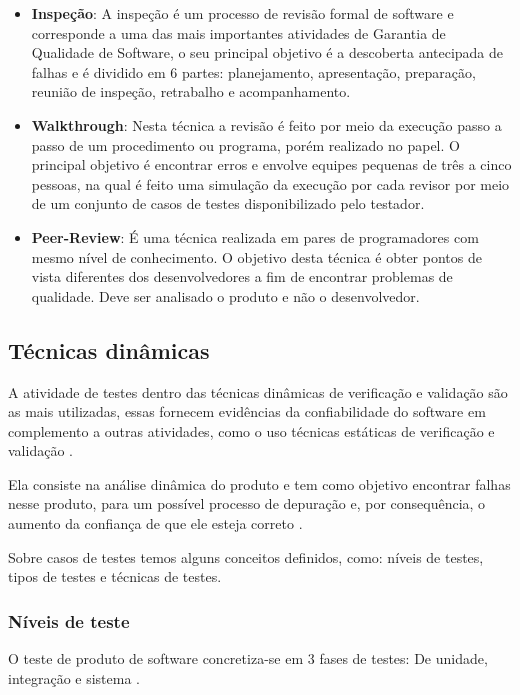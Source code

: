 \begin{itemize}
  \item \textbf{Inspeção}: A inspeção é um processo de revisão formal de software e corresponde a uma das mais importantes atividades de Garantia de Qualidade de Software, o seu principal objetivo é a descoberta antecipada de falhas e é dividido em 6 partes: planejamento, apresentação, preparação, reunião de inspeção, retrabalho e acompanhamento.
  \item \textbf{Walkthrough}: Nesta técnica a revisão é feito por meio da execução passo a passo de um procedimento ou programa, porém realizado no papel. O principal objetivo é encontrar erros e envolve equipes pequenas de três a cinco pessoas, na qual é feito uma simulação da execução por cada revisor por meio de um conjunto de casos de testes disponibilizado pelo testador.
  \item \textbf{Peer-Review}: É uma técnica realizada em pares de programadores com mesmo nível de conhecimento. O objetivo desta técnica é obter pontos de vista diferentes dos desenvolvedores a fim de encontrar problemas de qualidade. Deve ser analisado o produto e não o desenvolvedor.
\end{itemize}

\subsection{Técnicas dinâmicas}

A atividade de testes dentro das técnicas dinâmicas de verificação e validação são as mais utilizadas, essas fornecem evidências da confiabilidade do software em complemento a outras atividades, como o uso técnicas estáticas de verificação e validação \cite{jino}.

Ela consiste na análise dinâmica do produto e tem como objetivo encontrar falhas nesse produto, para um possível processo de depuração e, por consequência, o aumento da confiança de que ele esteja correto \cite{rocha}.

Sobre casos de testes temos alguns conceitos definidos, como: níveis de testes, tipos de testes e técnicas de testes.

\subsubsection{Níveis de teste}

O teste de produto de software concretiza-se em 3 fases de testes: De unidade, integração e sistema \cite{myers}.

